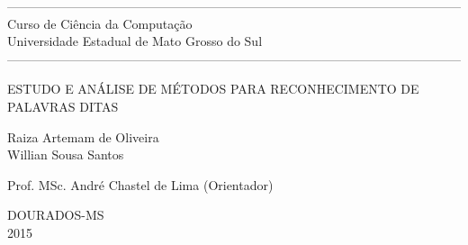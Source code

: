 \thispagestyle{empty}
\begin{center}

------------------------------------------------------------------------------------------------------------
\normalsize{Curso de Ciência da Computação \\ Universidade Estadual de Mato Grosso do Sul}
------------------------------------------------------------------------------------------------------------

\vspace*{3cm}

\Large{ESTUDO E ANÁLISE DE MÉTODOS PARA RECONHECIMENTO DE PALAVRAS DITAS}


\vspace*{3cm}
\normalsize{Raiza Artemam de Oliveira \\ Willian Sousa Santos}

\vspace*{2cm}

\normalsize{Prof. MSc. André Chastel de Lima (Orientador)}

\vspace*{6cm}


\large{DOURADOS-MS \\ 2015}
\end{center}